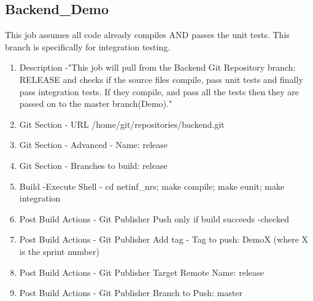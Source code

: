 \subsection{Backend\_Demo}

This job assumes all code already compiles AND passes the unit tests. This branch is specifically for integration testing.

\begin{enumerate}
\item Description -"This job will pull from the Backend Git Repository branch: RELEASE and checks if the source files compile, pass unit tests and finally pass integration tests. If they compile, and pass all the tests then they are passed on to the master branch(Demo)."
\item Git Section - URL /home/git/repositories/backend.git
\item Git Section - Advanced - Name: release
\item Git Section - Branches to build: release
\item Build -Execute Shell - cd netinf\_nrs; make compile; make eunit; make integration
\item Post Build Actions - Git Publisher Push only if build succeeds -checked
\item Post Build Actions - Git Publisher Add tag - Tag to push: DemoX (where X is the sprint number)
\item Post Build Actions - Git Publisher Target Remote Name: release
\item Post Build Actions - Git Publisher Branch to Push: master
\end{enumerate}

